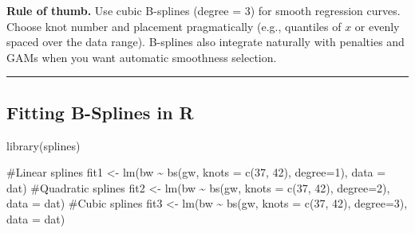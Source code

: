 \documentclass[
  letterpaper,
  DIV=11,
  numbers=noendperiod]{scrreprt}
\newenvironment{Shaded}{\begin{snugshade}}{\end{snugshade}}
\newcommand{\AttributeTok}[1]{\textcolor[rgb]{0.40,0.45,0.13}{#1}}
\newcommand{\CommentTok}[1]{\textcolor[rgb]{0.37,0.37,0.37}{#1}}
\newcommand{\DecValTok}[1]{\textcolor[rgb]{0.68,0.00,0.00}{#1}}
\newcommand{\FunctionTok}[1]{\textcolor[rgb]{0.28,0.35,0.67}{#1}}
\newcommand{\NormalTok}[1]{\textcolor[rgb]{0.00,0.23,0.31}{#1}}
\newcommand{\OtherTok}[1]{\textcolor[rgb]{0.00,0.23,0.31}{#1}}
\newcommand{\SpecialCharTok}[1]{\textcolor[rgb]{0.37,0.37,0.37}{#1}}
\begin{document}
\begin{tcolorbox}[enhanced jigsaw, breakable, colbacktitle=quarto-callout-note-color!10!white, left=2mm, colframe=quarto-callout-note-color-frame, opacityback=0, coltitle=black, colback=white, rightrule=.15mm, title=\textcolor{quarto-callout-note-color}{\faInfo}\hspace{0.5em}{Note}, titlerule=0mm, opacitybacktitle=0.6, leftrule=.75mm, toprule=.15mm, arc=.35mm, bottomtitle=1mm, toptitle=1mm, bottomrule=.15mm]

\textbf{Rule of thumb.} Use cubic B-splines (degree = 3) for smooth
regression curves. Choose knot number and placement pragmatically (e.g.,
quantiles of \(x\) or evenly spaced over the data range). B-splines also
integrate naturally with penalties and GAMs when you want automatic
smoothness selection.

\end{tcolorbox}

\begin{center}\rule{0.5\linewidth}{0.5pt}\end{center}

\hypertarget{fitting-b-splines-in-r}{%
\subsection*{Fitting B-Splines in R}\label{fitting-b-splines-in-r}}

\begin{Shaded}
\begin{Highlighting}[]
\FunctionTok{library}\NormalTok{(splines)    }

    \CommentTok{\#Linear splines}
\NormalTok{    fit1 }\OtherTok{\textless{}{-}} \FunctionTok{lm}\NormalTok{(bw }\SpecialCharTok{\textasciitilde{}} \FunctionTok{bs}\NormalTok{(gw, }\AttributeTok{knots =} \FunctionTok{c}\NormalTok{(}\DecValTok{37}\NormalTok{, }\DecValTok{42}\NormalTok{), }\AttributeTok{degree=}\DecValTok{1}\NormalTok{), }\AttributeTok{data =}\NormalTok{ dat)}
    \CommentTok{\#Quadratic splines}
\NormalTok{    fit2 }\OtherTok{\textless{}{-}} \FunctionTok{lm}\NormalTok{(bw }\SpecialCharTok{\textasciitilde{}} \FunctionTok{bs}\NormalTok{(gw, }\AttributeTok{knots =} \FunctionTok{c}\NormalTok{(}\DecValTok{37}\NormalTok{, }\DecValTok{42}\NormalTok{), }\AttributeTok{degree=}\DecValTok{2}\NormalTok{), }\AttributeTok{data =}\NormalTok{ dat)}
    \CommentTok{\#Cubic splines}
\NormalTok{    fit3 }\OtherTok{\textless{}{-}} \FunctionTok{lm}\NormalTok{(bw }\SpecialCharTok{\textasciitilde{}} \FunctionTok{bs}\NormalTok{(gw, }\AttributeTok{knots =} \FunctionTok{c}\NormalTok{(}\DecValTok{37}\NormalTok{, }\DecValTok{42}\NormalTok{), }\AttributeTok{degree=}\DecValTok{3}\NormalTok{), }\AttributeTok{data =}\NormalTok{ dat)}
\end{Highlighting}
\end{Shaded}
\end{document}
